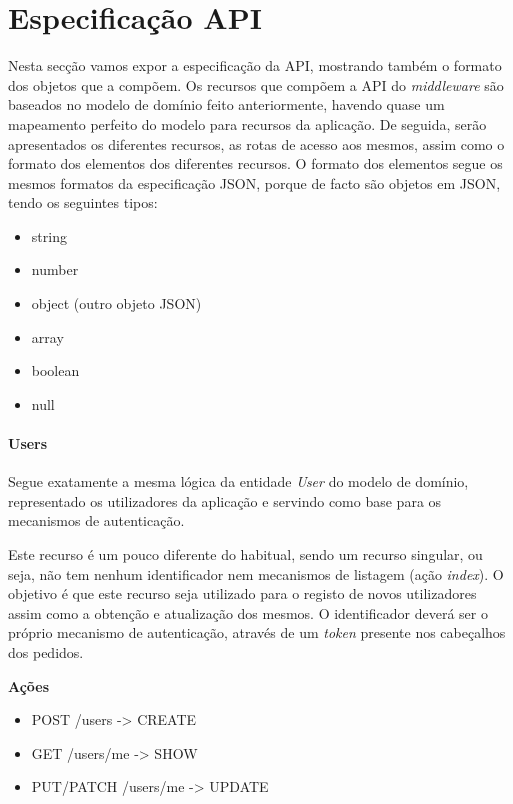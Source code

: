 \section{Especificação API}

Nesta secção vamos expor a especificação da API, mostrando também o formato dos objetos que a compõem. Os recursos que compõem a API do \textit{middleware} são baseados no modelo de domínio feito anteriormente, havendo quase um mapeamento perfeito do modelo para recursos da aplicação. De seguida, serão apresentados os diferentes recursos, as rotas de acesso aos mesmos, assim como o formato dos elementos dos diferentes recursos. O formato dos elementos segue os mesmos formatos da especificação JSON, porque de facto são objetos em JSON, tendo os seguintes tipos:
\begin{itemize}
    \item string
    \item number
    \item object (outro objeto JSON)
    \item array
    \item boolean
    \item null
\end{itemize}

\paragraph*{Users}

Segue exatamente a mesma lógica da entidade \textit{User} do modelo de domínio, representado os utilizadores da aplicação e servindo como base para os mecanismos de autenticação.

Este recurso é um pouco diferente do habitual, sendo um recurso singular, ou seja, não tem nenhum identificador nem mecanismos de listagem (ação \textit{index}). O objetivo é que este recurso seja utilizado para o registo de novos utilizadores assim como a obtenção e atualização dos mesmos. O identificador deverá ser o próprio mecanismo de autenticação, através de um \textit{token} presente nos cabeçalhos dos pedidos.

\textbf{Ações}
\begin{itemize}
    \item POST /users -> CREATE
    \item GET /users/me -> SHOW
    \item PUT/PATCH /users/me -> UPDATE
\end{itemize}

